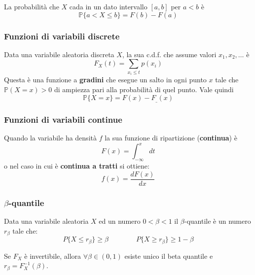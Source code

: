 \begin{proposition}
	La probabilità che $X$ cada in un dato intervallo $[a,b]$ per $a<b$ è
	\begin{equation}
		\mathbb{P}\{a < X \leq b\}=F(b)-F(a)
	\end{equation}
\end{proposition}

\subsubsection{Funzioni di variabili discrete}
Data una variabile aleatoria discreta $X$, la sua c.d.f. che assume valori $x_1, x_2, \ldots$ è
\begin{equation}
	F_X(t) = \sum_{x_i \leq t}p(x_i)
\end{equation}
Questa è una funzione a \textbf{gradini} che esegue un salto in ogni punto $x$ tale che $\mathbb{P}(X=x)>0$ di ampiezza pari alla probabilità di quel punto. Vale quindi
\begin{equation}
	\mathbb{P}\{X=x\} = F(x) - F_\_(x)
\end{equation}
\subsubsection{Funzioni di variabili continue}
Quando la variabile ha densità $f$ la sua funzione di ripartizione (\textbf{continua}) è
\begin{equation}
	F(x)=\int_{-\infty}^{x}dt
\end{equation}
o nel caso in cui è \textbf{continua a tratti} si ottiene:
\begin{equation}
	f(x) = \frac{dF(x)}{dx}
\end{equation}

\subsubsection{$\beta$-quantile}
\begin{definition}
	Data una variabile aleatoria $X$ ed un numero $0 < \beta < 1$ il $\beta$-quantile è un numero $r_\beta$ tale che:
	\begin{equation}
		P\{X \leq r_\beta\} \geq \beta \qquad\qquad P\{X \geq r_\beta\} \geq 1-\beta
	\end{equation}
\end{definition}

\begin{observation}
	Se $F_X$ è invertibile, allora $\forall \beta \in (0,1)$ esiste unico il beta quantile e $r_\beta = F_X^{-1}(\beta)$.
\end{observation}

